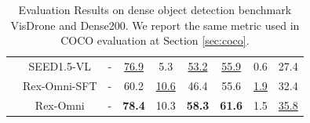\begin{table}[t]
{\begin{tabular}{cc|c|ccc|ccc}
& SEED1.5-VL         & - & \underline{76.9} & 5.3 & \underline{53.2} & \underline{55.9} & 0.6 & 27.4 \\
\rowcolor{lightblue!10}
& Rex-Omni-SFT       & - & 60.2 & \underline{10.6} & 46.4 & 55.6 & \underline{1.9} & 32.4 \\
\rowcolor{lightblue!10}
& Rex-Omni           & - & \textbf{78.4} & 10.3 & \textbf{58.3} & \textbf{61.6} & 1.5 & \underline{35.8} \\
\bottomrule
\end{tabular}
    }
    \caption{Evaluation Results on dense object detection benchmark VisDrone and Dense200. We report the same metric used in COCO evaluation at Section \ref{sec:coco}.}
    \label{tab:dense_object_detection}
\end{table}
